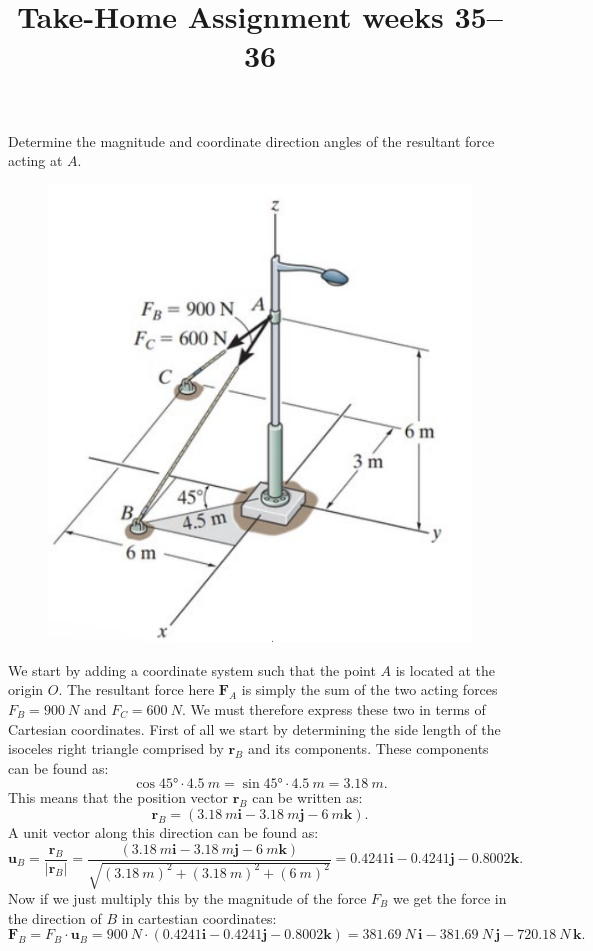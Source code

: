\documentclass[a4paper]{article}
\title{Take-Home Assignment weeks 35--36}
\date{}
\begin{document}
\maketitle

Determine the magnitude and coordinate direction angles of the resultant force acting at $A$.

\begin{figure} [ht]
  \centering
  \includegraphics[width=0.5\linewidth]{../figures/P1_1}
  \label{fig:P1_1}
\end{figure}

We start by adding a coordinate system such that the point $A$ is located at the origin $O$. The resultant force here $\textbf{F}_A$ is simply the sum of the two acting forces $F_B = \qty{900}{N}$ and $F_C = \qty{600}{N}$. We must therefore express these two in terms of Cartesian coordinates. First of all we start by determining the side length of the isoceles right triangle comprised by $\textbf{r}_B$ and its components. These components can be found as:
\[ 
  \cos \ang{45} \cdot \qty{4.5}{m} = \sin \ang{45} \cdot \qty{4.5}{m} = \qty{3,18}{m}
.\]
This means that the position vector $\textbf{r}_B$ can be written as:
\[ 
\textbf{r}_B = \left( \qty{3,18}{m} \textbf{i} - \qty{3,18}{m} \textbf{j} - \qty{6}{m} \textbf{k} \right)
.\]
A unit vector along this direction can be found as:
\[ 
\textbf{u}_B = \frac{\textbf{r}_B}{\left| \textbf{r}_B \right|} = \frac{ \left( \qty{3,18}{m} \textbf{i} - \qty{3,18}{m} \textbf{j} - \qty{6}{m} \textbf{k} \right)}{\sqrt{ \left( \qty{3,18}{m}  \right)^2 + \left( \qty{3,18}{m}  \right)^2 + \left( \qty{6}{m}  \right)^2 }} = \num{0,4241}  \textbf{i} - \num{0,4241}  \textbf{j} - \num{0,8002} \textbf{k}
.\]
Now if we just multiply this by the magnitude of the force $F_B$ we get the force in the direction of $B$ in cartestian coordinates:
\[ 
\textbf{F}_B = F_B \cdot \textbf{u}_B = \qty{900}{N} \cdot \left( \num{0,4241} \textbf{i} - \num{0,4241} \textbf{j} - \num{0,8002} \textbf{k}  \right) = \qty{381,69}{N} \, \textbf{i} - \qty{381,69}{N} \, \textbf{j} - \qty{720,18}{N} \, \textbf{k}
.\]
\end{document}

